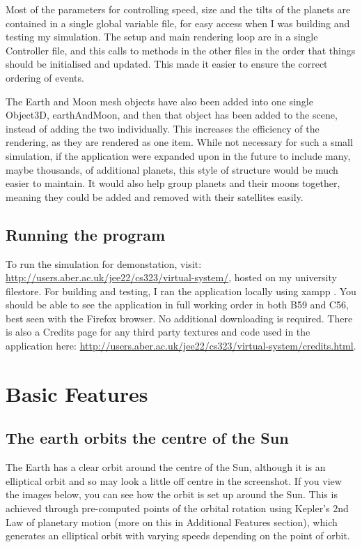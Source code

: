 \documentclass[12pt]{article}
\begin{document}
Most of the parameters for controlling speed, size and the tilts of the planets are contained in a single global variable file, for easy access when I was building and testing my simulation. The setup and main rendering loop are in a single Controller file, and this calls to methods in the other files in the order that things should be initialised and updated. This made it easier to ensure the correct ordering of events.

The Earth and Moon mesh objects have also been added into one single Object3D, earthAndMoon, and then that object has been added to the scene, instead of adding the two individually. This increases the efficiency of the rendering, as they are rendered as one item. While not necessary for such a small simulation, if the application were expanded upon in the future to include many, maybe thousands, of additional planets, this style of structure would be much easier to maintain. It would also help group planets and their moons together, meaning they could be added and removed with their satellites easily.

\subsection{Running the program}
To run the simulation for demonstation, visit: \url{http://users.aber.ac.uk/jee22/cs323/virtual-system/}, hosted on my university filestore. For building and testing, I ran the application locally using xampp\cite{xampp} . You should be able to see the application in full working order in both B59 and C56, best seen with the Firefox browser. No additional downloading is required. There is also a Credits page for any third party textures and code used in the application here: \url{http://users.aber.ac.uk/jee22/cs323/virtual-system/credits.html}.



\section{Basic Features}
\subsection{The earth orbits the centre of the Sun}
The Earth has a clear orbit around the centre of the Sun, although it is an elliptical orbit and so may look a little off centre in the screenshot. If you view the images below, you can see how the orbit is set up around the Sun. This is achieved through pre-computed points of the orbital rotation using Kepler's 2nd Law of planetary motion (more on this in Additional Features section), which generates an elliptical orbit with varying speeds depending on the point of orbit.
\end{document}
